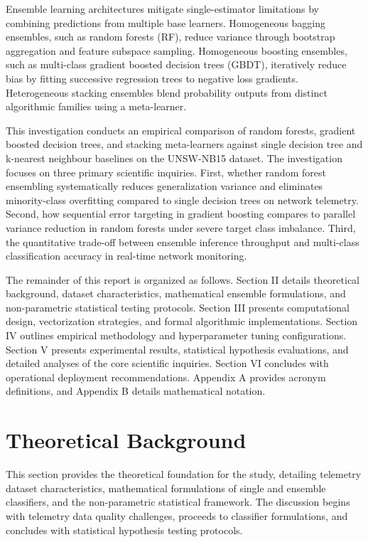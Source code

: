 \documentclass[10pt,conference,compsoc]{IEEEtran}
\begin{document}
Ensemble learning architectures mitigate single-estimator limitations by combining predictions from multiple base learners. Homogeneous bagging ensembles, such as random forests (RF), reduce variance through bootstrap aggregation and feature subspace sampling. Homogeneous boosting ensembles, such as multi-class gradient boosted decision trees (GBDT), iteratively reduce bias by fitting successive regression trees to negative loss gradients. Heterogeneous stacking ensembles blend probability outputs from distinct algorithmic families using a meta-learner.

This investigation conducts an empirical comparison of random forests, gradient boosted decision trees, and stacking meta-learners against single decision tree and k-nearest neighbour baselines on the UNSW-NB15 dataset. The investigation focuses on three primary scientific inquiries. First, whether random forest ensembling systematically reduces generalization variance and eliminates minority-class overfitting compared to single decision trees on network telemetry. Second, how sequential error targeting in gradient boosting compares to parallel variance reduction in random forests under severe target class imbalance. Third, the quantitative trade-off between ensemble inference throughput and multi-class classification accuracy in real-time network monitoring.

The remainder of this report is organized as follows. Section II details theoretical background, dataset characteristics, mathematical ensemble formulations, and non-parametric statistical testing protocols. Section III presents computational design, vectorization strategies, and formal algorithmic implementations. Section IV outlines empirical methodology and hyperparameter tuning configurations. Section V presents experimental results, statistical hypothesis evaluations, and detailed analyses of the core scientific inquiries. Section VI concludes with operational deployment recommendations. Appendix A provides acronym definitions, and Appendix B details mathematical notation.

\section{Theoretical Background}

This section provides the theoretical foundation for the study, detailing telemetry dataset characteristics, mathematical formulations of single and ensemble classifiers, and the non-parametric statistical framework. The discussion begins with telemetry data quality challenges, proceeds to classifier formulations, and concludes with statistical hypothesis testing protocols.
\end{document}
